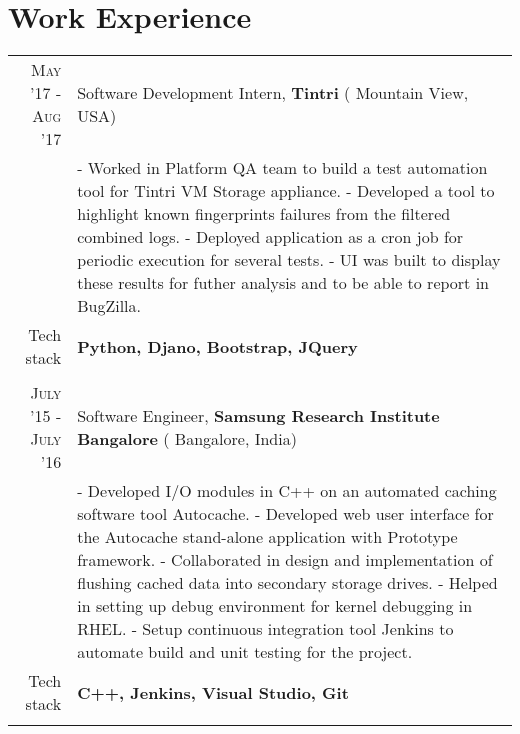 \section{Work Experience}
\renewcommand{\arraystretch}{0.95}%
\begin{tabular}{r|p{14cm}}
\textsc{May '17 - Aug '17} & Software Development Intern, \textbf{Tintri} ( Mountain View, USA)\\
& \small{
- Worked in Platform QA team to build a test automation tool for Tintri VM Storage appliance.\newline
- Developed a tool to highlight known fingerprints failures from the filtered combined logs. \newline
- Deployed application as a cron job for periodic execution for several tests.\newline
- UI was built to display these results for futher analysis and to be able to report in BugZilla.} \\
\small{Tech stack} &\footnotesize{\textbf{Python, Djano, Bootstrap, JQuery}} \\
\multicolumn{2}{c}{} \\

\textsc{July '15 - July '16} & Software Engineer, \textbf{Samsung Research Institute Bangalore} ( Bangalore, India) \\
& \small{
- Developed I/O modules in C++ on an automated caching software tool Autocache.\newline
- Developed web user interface for the Autocache stand-alone application with Prototype framework.\newline
- Collaborated in design and implementation of flushing cached data into secondary storage drives.\newline
- Helped in setting up debug environment for kernel debugging in RHEL. \newline
- Setup continuous integration tool Jenkins to automate build and unit testing for the project.}\\
\small{Tech stack} &\footnotesize{\textbf{C++, Jenkins, Visual Studio, Git}} \\
\multicolumn{2}{c}{} \\




\end{tabular}
